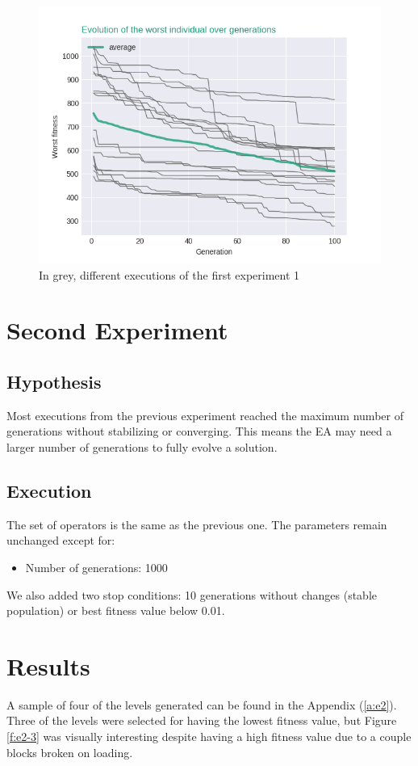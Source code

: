 \begin{figure}[H]
	\centering
	\includegraphics[scale=0.55]{gfx/exp1_worstIndv.png}
	\caption{In grey, different executions of the first experiment 1}\label{f:grahp1}
\end{figure}

\section{Second Experiment}
\subsection{Hypothesis}
Most executions from the previous experiment reached the maximum number of generations without stabilizing or converging. This means the \acs{EA} may need a larger number of generations to fully evolve a solution. 
\subsection{Execution}
The set of operators is the same as the previous one. The parameters remain unchanged except for:
\begin{itemize}
	\item Number of generations: 1000
\end{itemize}
We also added two stop conditions: 10 generations without changes (stable population) or best fitness value below 0.01.
\section{Results}
A sample of four of the levels generated can be found in the Appendix (\ref{a:e2}). Three of the levels were selected for having the lowest fitness value, but Figure \ref{f:e2-3} was visually interesting despite having a high fitness value due to a couple blocks broken on loading. 

